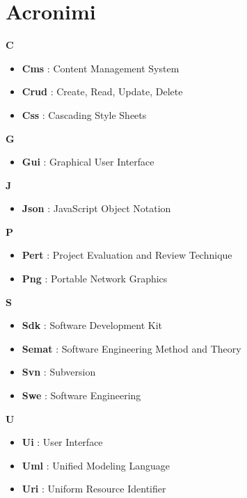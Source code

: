 \section*{Acronimi}
{\huge \textbf{C}}
\begin{flushleft}
\begin{itemize}[label={}]
\item \textbf{Cms} : Content Management System
\item \textbf{Crud} : Create, Read, Update, Delete
\item \textbf{Css} : Cascading Style Sheets
\end{itemize}
\end{flushleft}
{\huge \textbf{G}}
\begin{flushleft}
\begin{itemize}[label={}]
\item \textbf{Gui} : Graphical User Interface
\end{itemize}
\end{flushleft}
{\huge \textbf{J}}
\begin{flushleft}
\begin{itemize}[label={}]
\item \textbf{Json} : JavaScript Object Notation
\end{itemize}
\end{flushleft}
{\huge \textbf{P}}
\begin{flushleft}
\begin{itemize}[label={}]
\item \textbf{Pert} : Project Evaluation and Review Technique
\item \textbf{Png} : Portable Network Graphics
\end{itemize}
\end{flushleft}
{\huge \textbf{S}}
\begin{flushleft}
\begin{itemize}[label={}]
\item \textbf{Sdk} : Software Development Kit
\item \textbf{Semat} : Software Engineering Method and Theory
\item \textbf{Svn} : Subversion
\item \textbf{Swe} : Software Engineering
\end{itemize}
\end{flushleft}
{\huge \textbf{U}}
\begin{flushleft}
\begin{itemize}[label={}]
\item \textbf{Ui} : User Interface
\item \textbf{Uml} : Unified Modeling Language
\item \textbf{Uri} : Uniform Resource Identifier
\end{itemize}
\end{flushleft}
